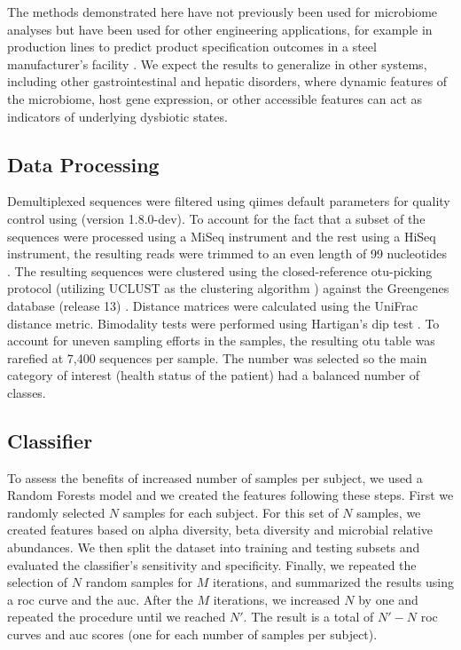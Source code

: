 The methods demonstrated here have not previously been used for microbiome analyses but have been used for other engineering applications, for example in production lines to predict product specification outcomes in a steel manufacturer's facility \cite{RN4216}. We expect the results to generalize in other systems, including other gastrointestinal and hepatic disorders, where dynamic features of the microbiome, host gene expression, or other accessible features can act as indicators of underlying dysbiotic states.

\subsection{Data Processing}

Demultiplexed sequences were filtered using \glspl{qiime} \cite{RN110} default parameters for quality control using (version 1.8.0-dev). To account for the fact that a subset of the sequences were processed using a MiSeq instrument and the rest using a HiSeq instrument, the resulting reads were trimmed to an even length of 99 nucleotides \cite{RN4221, RN4222}. The resulting sequences were clustered using the closed-reference \gls{otu}-picking protocol (utilizing UCLUST as the clustering algorithm \cite{RN81}) against the Greengenes database (release 13) \cite{RN165}. Distance matrices were calculated using the UniFrac \cite{RN83} distance metric. Bimodality tests were performed using Hartigan's dip test \cite{RN4017}. To account for uneven sampling efforts in the samples, the resulting \gls{otu} table was rarefied at 7,400 sequences per sample. The number was selected so the main category of interest (health status of the patient) had a balanced number of classes.

\subsection{Classifier}

To assess the benefits of increased number of samples per subject, we used a Random Forests \cite{RN4205} model and we created the features following these steps. First we randomly selected $N$ samples for each subject.  For this set of $N$ samples, we created features based on alpha diversity, beta diversity and microbial relative abundances. We then split the dataset into training and testing subsets and evaluated the classifier's sensitivity and specificity. Finally, we repeated the selection of $N$ random samples for $M$ iterations, and summarized the results using a \gls{roc} curve and the \gls{auc}. After the $M$ iterations, we increased $N$ by one and repeated the procedure until we reached $N'$. The result is a total of $N'-N$ \gls{roc} curves and \gls{auc} scores (one for each number of samples per subject).


